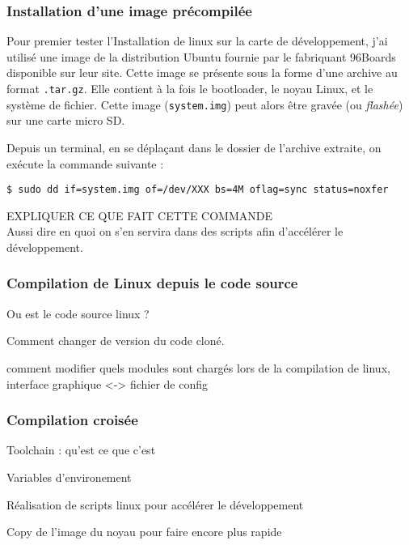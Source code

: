 \subsubsection{Installation d'une image précompilée}

Pour premier tester l'Installation de linux sur la carte de développement, j'ai utilisé une image de la distribution Ubuntu fournie par le fabriquant 96Boards disponible sur leur site. Cette image se présente sous la forme d'une archive au format \texttt{.tar.gz}. Elle contient à la fois le \gls{bootloader}, le noyau Linux, et le système de fichier. Cette image (\texttt{system.img}) peut alors être gravée (ou \textit{flashée}) sur une carte micro SD. 

Depuis un terminal, en se déplaçant dans le dossier de l'archive extraite, on exécute la commande suivante : 
\begin{lstlisting}[style=command]
$ sudo dd if=system.img of=/dev/XXX bs=4M oflag=sync status=noxfer
\end{lstlisting}

\begin{center}
    \color{red}
    EXPLIQUER CE QUE FAIT CETTE COMMANDE \\
    Aussi dire en quoi on s'en servira dans des scripts afin d'accélérer le développement.
\end{center}


\subsubsection{Compilation de Linux depuis le code source}\label{sec:compilation-linux-source}

Ou est le code source linux ?

Comment changer de version du code cloné. 

comment modifier quels modules sont chargés lors de la compilation de linux, interface graphique <-> fichier de config
\subsubsection{Compilation croisée}

Toolchain : qu'est ce que c'est

Variables d'environement

Réalisation de scripts linux pour accélérer le développement

Copy de l'image du noyau pour faire encore plus rapide


